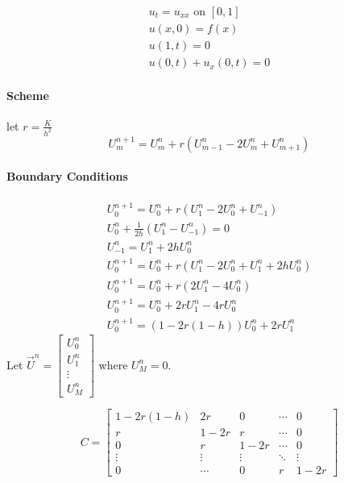\documentclass[a4paper, 10pt]{article}
\begin{document}
\begin{example}{}{}
    \begin{align*}
        u_t = u_{xx} \text{ on } [0,1] \\
        u(x, 0) = f(x)                 \\
        u(1, t) = 0                    \\
        u(0, t) + u_x(0, t) = 0
    \end{align*}
    \paragraph{Scheme}
    let \( r= \frac{K}{h^2} \)
    \[
        U_m^{n+1} = U_m^n + r(U_{m-1}^n - 2U_m^n + U_{m+1}^n)
    \]
    \paragraph{Boundary Conditions}
    \begin{align*}
        U_0^{n+1} = U_0^n + r(U_1^n - 2U_0^n + U_{-1}^n)        \\
        U_0^n + \frac{1}{2h}(U_1^n - U_{-1}^n) = 0              \\
        U_{-1}^n = U_1^n + 2hU_0^n                              \\
        U_0^{n+1} = U_0^n + r(U_1^n - 2U_0^n + U_1^n + 2hU_0^n) \\
        U_0^{n+1} = U_0^n + r(2U_1^n - 4U_0^n)                  \\
        U_0^{n+1} = U_0^n + 2rU_1^n - 4rU_0^n                   \\
        U_0^{n+1} = (1 - 2r(1 - h))U_0^n + 2rU_1^n
    \end{align*}
    Let \( \vec{U}^n = \begin{bmatrix} U_0^n \\ U_1^n \\ \vdots \\ U_M^n \end{bmatrix} \) where \( U_M^n = 0 \).

    \[
        C = \begin{bmatrix}
            1 - 2r(1 - h) & 2r     & 0      & \cdots & 0      \\
            r             & 1 - 2r & r      & \cdots & 0      \\
            0             & r      & 1 - 2r & \cdots & 0      \\
            \vdots        & \vdots & \vdots & \ddots & \vdots \\
            0             & \cdots & 0      & r      & 1 - 2r
        \end{bmatrix}
    \]


\end{example}
\end{document}
